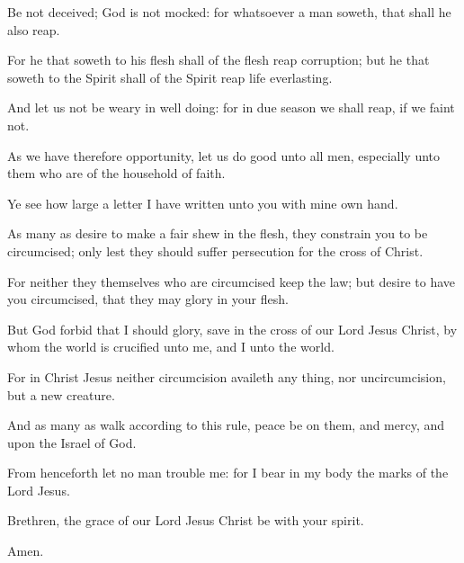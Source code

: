 \verse Be not deceived; God is not mocked: for whatsoever a man soweth, that shall he also reap.

\verse For he that soweth to his flesh shall of the flesh reap corruption; but he that soweth to the Spirit shall of the Spirit reap life everlasting.

\verse And let us not be weary in well doing: for in due season we shall reap, if we faint not.

\verse As we have therefore opportunity, let us do good unto all men, especially unto them who are of the household of faith.

\verse Ye see how large a letter I have written unto you with mine own hand.

\verse As many as desire to make a fair shew in the flesh, they constrain you to be circumcised; only lest they should suffer persecution for the cross of Christ.

\verse For neither they themselves who are circumcised keep the law; but desire to have you circumcised, that they may glory in your flesh.

\verse But God forbid that I should glory, save in the cross of our Lord Jesus Christ, by whom the world is crucified unto me, and I unto the world.

\verse For in Christ Jesus neither circumcision availeth any thing, nor uncircumcision, but a new creature.

\verse And as many as walk according to this rule, peace be on them, and mercy, and upon the Israel of God.

\verse From henceforth let no man trouble me: for I bear in my body the marks of the Lord Jesus.

\verse Brethren, the grace of our Lord Jesus Christ be with your spirit.

Amen.

